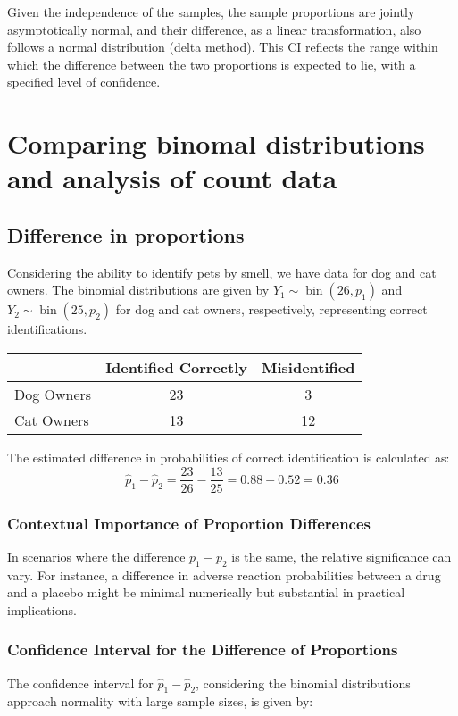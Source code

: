 \documentclass{article}
\begin{document}
Given the independence of the samples, the sample proportions are jointly asymptotically normal, and their difference, as a linear transformation, also follows a normal distribution (delta method). This CI reflects the range within which the difference between the two proportions is expected to lie, with a specified level of confidence.

\section{Comparing binomal distributions and analysis of count data}

\subsection{Difference in proportions}

Considering the ability to identify pets by smell, we have data for dog and cat owners. The binomial distributions are given by $Y_{1} \sim \operatorname{bin}\left(26, p_{1}\right)$ and $Y_{2} \sim \operatorname{bin}\left(25, p_{2}\right)$ for dog and cat owners, respectively, representing correct identifications.

\begin{center}
\begin{tabular}{lcc}
\hline
 & Identified Correctly & Misidentified \\
\hline
Dog Owners & 23 & 3 \\
Cat Owners & 13 & 12 \\
\hline
\end{tabular}
\end{center}

The estimated difference in probabilities of correct identification is calculated as:
$$
\hat{p}_{1} - \hat{p}_{2} = \frac{23}{26} - \frac{13}{25} = 0.88 - 0.52 = 0.36
$$

\subsubsection{Contextual Importance of Proportion Differences}
In scenarios where the difference $p_{1} - p_{2}$ is the same, the relative significance can vary. For instance, a difference in adverse reaction probabilities between a drug and a placebo might be minimal numerically but substantial in practical implications.

\subsubsection{Confidence Interval for the Difference of Proportions}
The confidence interval for $\hat{p}_{1} - \hat{p}_{2}$, considering the binomial distributions approach normality with large sample sizes, is given by:
\end{document}
